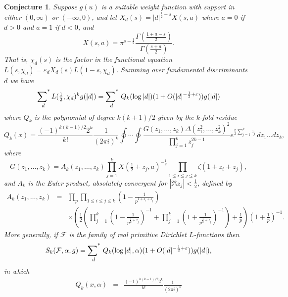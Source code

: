\documentclass[12pt,letterpaper]{amsart}
\theoremstyle{plain}
\newtheorem{conjecture}[theorem]{Conjecture}
\theoremstyle{definition}
\theoremstyle{remark}
\numberwithin{equation}{subsection}
\numberwithin{theorem}{subsection}
\numberwithin{table}{subsection}
\def\({\left(}
\def\){\right)}
\def\sumstar{\operatornamewithlimits{\sum\nolimits^*}}
\begin{document}
\begin{conjecture}
  Suppose $g(u)$ is a suitable weight
function with support in either $(0,\infty)$ or $(-\infty,0)$,
and let $X_d(s)=|d|^{\frac12-s}X(s,a)$ where
$a=0$ if $d>0$   and  $a=1$ if $d<0$, and
\begin{equation}
X(s,a) = \pi^{s-\frac12}
        \frac{\Gamma\(\frac{1+a-s}{2}\)}{\Gamma\(\frac{s+a}{2}\)} .
\end{equation}
That is, $\chi_d(s)$ is the factor in the functional equation
$L(s,\chi_d)=\varepsilon_d X_d(s)L(1-s,\chi_d)$.
Summing over fundamental discriminants $d$ we have
\begin{equation}
\sumstar_{\!d}L(\tfrac12 ,\chi_d)^kg(|d|)= \sumstar_{\!d}\,Q_k(\log
{|d|})(1+O(|d|^{-\frac{1}{2}+\varepsilon})) g(|d|)
\end{equation}
where $Q_k$ is the polynomial of degree $k(k+1)/2$ given by
the $k$-fold residue
\begin{equation}
Q_k(x)= \frac{(-1)^{k(k-1)/2}2^k}{k!}
\frac{1}{(2\pi i)^{k}}
\oint \cdots \oint
\frac{G(z_1, \dots,z_{k})\Delta(z_1^2,\dots,z_{k}^2)^2}
{\displaystyle \prod_{j=1}^{k} z_j^{2k-1}}
e^{\tfrac x2 \sum_{j=1}^{k}z_j}\,dz_1\dots dz_{k} ,
\end{equation}
where
\begin{equation}
G(z_1,\dots,z_k)=A_k(z_1,\dots,z_k) 
\prod_{j=1}^k X(\tfrac12+z_j,a)^{-\frac12}
\prod_{1\le i\le j\le k}\zeta(1+z_i+z_j),
\end{equation}
and $A_k$ is the Euler product, absolutely convergent for
$|\Re z_j|<\frac12 $, defined by
\begin{eqnarray}
A_k(z_1,\dots,z_k) & =  &\prod_p \prod_{1\le i \le j \le k}
\left(1-\frac{1}{p^{1+z_i+z_j}}\right) \nonumber \\&   &\times \left(\frac
12 \left(\prod_{j=1}^k\left( 1-\frac{1}{p^{\frac 12+z_j}}\right)^{-1} +
\prod_{j=1}^k\left(1+\frac{1}{p^{\frac12+z_j}}\right)^{-1}
\right)+\frac 1p \right) \left( 1+ \frac{1}{p}\right)^{-1}. \end{eqnarray}
More generally, if $\mathcal F$ is the family of real primitive Dirichlet
$L$-functions then
\begin{equation}
S_k({\mathcal F},\alpha,g) = \sumstar_{\!d}\,
Q_k(\log {|d|} , \alpha ) (1+O(|d|^{-\frac12 + \varepsilon}))  g(|d|),
\end{equation}
in which
\begin{eqnarray}
Q_k(x, \alpha)& =  &\frac{(-1)^{k(k-1)/2}2^k}{k!} \frac{1}{(2\pi
i)^{k}} \nonumber \\

\end{eqnarray}
\end{conjecture}
\end{document}
